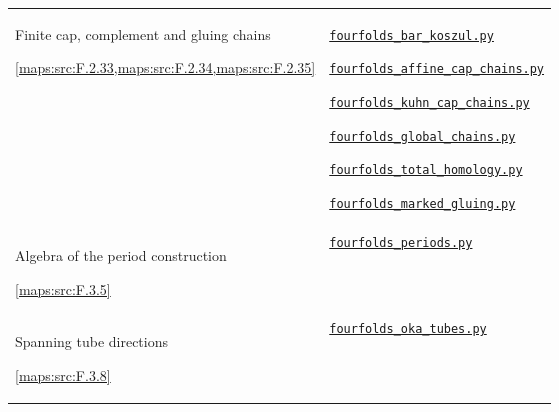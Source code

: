 \documentclass[11pt,a4paper]{article}
\numberwithin{equation}{section}
\theoremstyle{definition}
\newcommand{\SsixRepositoryCommit}{83d76022bcd442278b760db9ff438afceed6c6ea}
\begin{document}
\begin{longtable}{@{}p{}p{}@{}}
\hypertarget{prog:V:chains}{}Finite cap, complement and gluing chains\par \cref{maps:src:F.2.33,maps:src:F.2.34,maps:src:F.2.35} &
\href{https://github.com/KokunoYumeto/s6-complex-structure-workbench/blob/\SsixRepositoryCommit/pro_returns/S6_10_PAPERS_checkpoint_15_20261119T1045Z/S6_10_PAPERS/code/V/replay_chains/code/fourfolds_bar_koszul.py}{\nolinkurl{fourfolds_bar_koszul.py}}\par \href{https://github.com/KokunoYumeto/s6-complex-structure-workbench/blob/\SsixRepositoryCommit/pro_returns/S6_10_PAPERS_checkpoint_15_20261119T1045Z/S6_10_PAPERS/code/V/replay_chains/code/fourfolds_affine_cap_chains.py}{\nolinkurl{fourfolds_affine_cap_chains.py}}\par \href{https://github.com/KokunoYumeto/s6-complex-structure-workbench/blob/\SsixRepositoryCommit/pro_returns/S6_10_PAPERS_checkpoint_15_20261119T1045Z/S6_10_PAPERS/code/V/replay_chains/code/fourfolds_kuhn_cap_chains.py}{\nolinkurl{fourfolds_kuhn_cap_chains.py}}\par \href{https://github.com/KokunoYumeto/s6-complex-structure-workbench/blob/\SsixRepositoryCommit/pro_returns/S6_10_PAPERS_checkpoint_15_20261119T1045Z/S6_10_PAPERS/code/V/replay_chains/code/fourfolds_global_chains.py}{\nolinkurl{fourfolds_global_chains.py}}\par \href{https://github.com/KokunoYumeto/s6-complex-structure-workbench/blob/\SsixRepositoryCommit/pro_returns/S6_10_PAPERS_checkpoint_15_20261119T1045Z/S6_10_PAPERS/code/V/replay_chains/code/fourfolds_total_homology.py}{\nolinkurl{fourfolds_total_homology.py}}\par \href{https://github.com/KokunoYumeto/s6-complex-structure-workbench/blob/\SsixRepositoryCommit/pro_returns/S6_10_PAPERS_checkpoint_15_20261119T1045Z/S6_10_PAPERS/code/V/replay_chains/code/fourfolds_marked_gluing.py}{\nolinkurl{fourfolds_marked_gluing.py}} \\[3pt]
\hypertarget{prog:V:periods}{}Algebra of the period construction\par \cref{maps:src:F.3.5} &
\href{https://github.com/KokunoYumeto/s6-complex-structure-workbench/blob/\SsixRepositoryCommit/pro_returns/S6_10_PAPERS_checkpoint_15_20261119T1045Z/S6_10_PAPERS/code/V/replay_chains/code/fourfolds_periods.py}{\nolinkurl{fourfolds_periods.py}} \\[3pt]
\hypertarget{prog:V:tubes}{}Spanning tube directions\par \cref{maps:src:F.3.8} &
\href{https://github.com/KokunoYumeto/s6-complex-structure-workbench/blob/\SsixRepositoryCommit/pro_returns/S6_10_PAPERS_checkpoint_15_20261119T1045Z/S6_10_PAPERS/code/V/replay_chains/code/fourfolds_oka_tubes.py}{\nolinkurl{fourfolds_oka_tubes.py}} \\[3pt]

\end{longtable}
\end{document}
